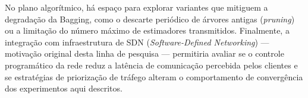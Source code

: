 No plano algorítmico, há espaço para explorar variantes que mitiguem a degradação da Bagging, como o descarte periódico de árvores antigas (\textit{pruning}) ou a limitação do número máximo de estimadores transmitidos. Finalmente, a integração com infraestrutura de SDN (\textit{Software-Defined Networking}) --- motivação original desta linha de pesquisa --- permitiria avaliar se o controle programático da rede reduz a latência de comunicação percebida pelos clientes e se estratégias de priorização de tráfego alteram o comportamento de convergência dos experimentos aqui descritos.
